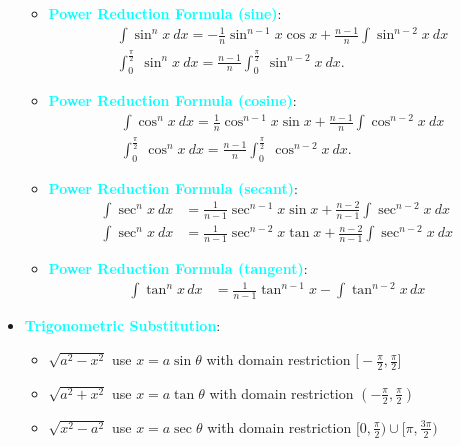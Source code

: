 \documentclass{report}
\begin{document}
\begin{itemize}
\begin{itemize}
                \item \textbf{\textcolor{cyan}{Power Reduction Formula (sine)}}:
                    \begin{align*}
                        &\int \sin^{n}{x}\ dx = -\frac{1}{n}\sin^{n-1}{x}\cos{x} + \frac{n-1}{n}\int \sin^{n-2}{x}\ dx \\
                        &\int_{0}^{\frac{\pi}{2}}\ \sin^{n}{x}\ dx = \frac{n-1}{n}\int_{0}^{\frac{\pi}{2}}\ \sin^{n-2}{x}\ dx
                    .\end{align*}
                \item \textbf{\textcolor{cyan}{Power Reduction Formula (cosine)}}:
                    \begin{align*}
                        &\int \cos^{n}{x}\ dx = \frac{1}{n}\cos^{n-1}{x}\sin{x} + \frac{n-1}{n}\int \cos^{n-2}{x}\ dx \\
                        &\int_{0}^{\frac{\pi}{2}}\ \cos^{n}{x}\ dx = \frac{n-1}{n}\int_{0}^{\frac{\pi}{2}}\ \cos^{n-2}{x}\ dx
                    .\end{align*}
                \item \textbf{\textcolor{cyan}{Power Reduction Formula (secant)}}:
                    \begin{align*}
                        \int \sec^{n}{x}\ dx &= \frac{1}{n-1}\sec^{n-1}{x}\sin{x}+\frac{n-2}{n-1}\int \sec^{n-2}{x}\ dx \\
                        \int \sec^{n}{x}\ dx &= \frac{1}{n-1}\sec^{n-2}{x}\tan{x}+\frac{n-2}{n-1}\int \sec^{n-2}{x}\ dx
                    \end{align*}

                \item \textbf{\textcolor{cyan}{Power Reduction Formula (tangent)}}:
                    \begin{align*}
                        \int \tan^n x \, dx &= \frac{1}{n-1} \tan^{n-1}x - \int \tan^{n-2}x \, dx
                    \end{align*}
            \end{itemize}
        \item \textbf{\textcolor{cyan}{Trigonometric Substitution}}:
            \begin{itemize}
                \item $\sqrt{a^{2} - x^{2}}$ use $x =a\sin{\theta }$ with domain restriction $\bigg[-\frac{\pi}{2},\frac{\pi}{2}\bigg] $
                \item $\sqrt{a^{2} + x^{2}}$ use $x=a\tan{\theta}$ with domain restriction $\left(-\frac{\pi}{2}, \frac{\pi}{2}\right)$
                \item $\sqrt{x^{2} - a^{2}}$ use $x =a\sec{\theta}$ with domain restriction $\bigg[0,\frac{\pi}{2}\bigg) \cup \bigg[\pi,\frac{3\pi}{2}\bigg)$ 
            \end{itemize}


\end{itemize}
\end{document}
